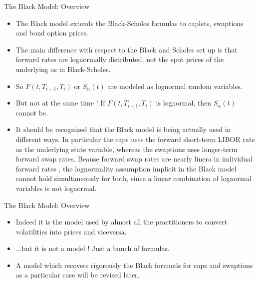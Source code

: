 \documentclass{beamer}
\begin{document}
\begin{frame}{The Black Model: Overview}
	\begin{itemize}
		\item The Black model extends the Black-Scholes formulas to caplets, swaptions and bond option prices. 
		\item The main difference with respect to the Black and Scholes set up is that forward rates are lognormally distributed, not the spot prices of the underlying as in Black-Scholes.
		\item So $F(t,T_{i-1},T_i)$ or $S_\alpha(t)$ are modeled as lognormal random variables.
		\item But not at the same time ! If $F(t,T_{i-1},T_i)$ is lognormal, then $S_\alpha(t)$ cannot be.
		\item It should be recognized that the Black model is being actually used in different ways. In particular the caps uses the forward short-term LIBOR rate as the underlying state variable, whereas the swaptions uses longer-term forward swap rates. Beause forward swap rates are nearly linera in individual forward rates , the lognormality assumption implicit in the Black model cannot hold simultaneously for both, since a linear combination of lognormal variables is not lognormal.
	\end{itemize}
\end{frame}

\begin{frame}{The Black Model: Overview}
	\begin{itemize}
		\item Indeed it is the model used by almost all the practitioners to convert volatilities into prices and viceversa.
		\item ...but it is not a model ! Just a bunch of formulas.
		\item A model which recovers rigorously the Black formuals for caps and swaptions as a particular case will be revised later. 
	\end{itemize}
\end{frame}
\end{document}
